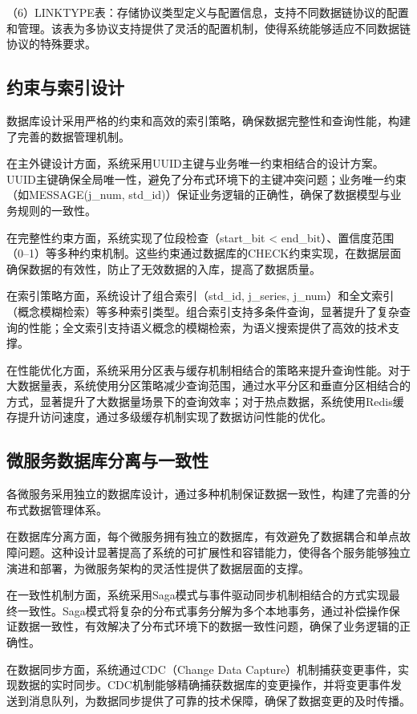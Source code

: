 （6）LINKTYPE表：存储协议类型定义与配置信息，支持不同数据链协议的配置和管理。该表为多协议支持提供了灵活的配置机制，使得系统能够适应不同数据链协议的特殊要求。

\subsection{约束与索引设计}

数据库设计采用严格的约束和高效的索引策略，确保数据完整性和查询性能，构建了完善的数据管理机制。

在主外键设计方面，系统采用UUID主键与业务唯一约束相结合的设计方案。UUID主键确保全局唯一性，避免了分布式环境下的主键冲突问题；业务唯一约束（如MESSAGE(j\_num, std\_id)）保证业务逻辑的正确性，确保了数据模型与业务规则的一致性。

在完整性约束方面，系统实现了位段检查（start\_bit < end\_bit）、置信度范围（0–1）等多种约束机制。这些约束通过数据库的CHECK约束实现，在数据层面确保数据的有效性，防止了无效数据的入库，提高了数据质量。

在索引策略方面，系统设计了组合索引（std\_id, j\_series, j\_num）和全文索引（概念模糊检索）等多种索引类型。组合索引支持多条件查询，显著提升了复杂查询的性能；全文索引支持语义概念的模糊检索，为语义搜索提供了高效的技术支撑。

在性能优化方面，系统采用分区表与缓存机制相结合的策略来提升查询性能。对于大数据量表，系统使用分区策略减少查询范围，通过水平分区和垂直分区相结合的方式，显著提升了大数据量场景下的查询效率；对于热点数据，系统使用Redis缓存提升访问速度，通过多级缓存机制实现了数据访问性能的优化。

\subsection{微服务数据库分离与一致性}

各微服务采用独立的数据库设计，通过多种机制保证数据一致性，构建了完善的分布式数据管理体系。

在数据库分离方面，每个微服务拥有独立的数据库，有效避免了数据耦合和单点故障问题。这种设计显著提高了系统的可扩展性和容错能力，使得各个服务能够独立演进和部署，为微服务架构的灵活性提供了数据层面的支撑。

在一致性机制方面，系统采用Saga模式与事件驱动同步机制相结合的方式实现最终一致性。Saga模式将复杂的分布式事务分解为多个本地事务，通过补偿操作保证数据一致性，有效解决了分布式环境下的数据一致性问题，确保了业务逻辑的正确性。

在数据同步方面，系统通过CDC（Change Data Capture）机制捕获变更事件，实现数据的实时同步。CDC机制能够精确捕获数据库的变更操作，并将变更事件发送到消息队列，为数据同步提供了可靠的技术保障，确保了数据变更的及时传播。

